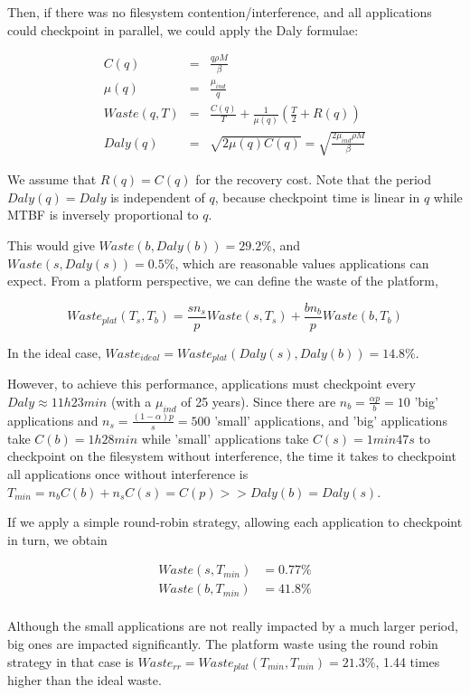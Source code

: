 \documentclass{article}
\begin{document}
Then, if there was no filesystem contention/interference, and all applications could checkpoint in parallel, we could apply the Daly formulae:

\begin{eqnarray}
C(q) &=& \frac{q\rho M}{\beta}\\
\mu(q) &=& \frac{\mu_{ind}}{q}\\
Waste(q, T) &=& \frac{C(q)}{T} + \frac{1}{\mu(q)}\left(\frac{T}{2}+R(q)\right)\\
Daly(q) &=& \sqrt{2\mu(q)C(q)} = \sqrt{\frac{2\mu_{ind}\rho M}{\beta}}
\end{eqnarray}

We assume that $R(q) =C(q)$ for the recovery cost. Note that the period $Daly(q)=Daly$ is independent of
$q$, because checkpoint time is linear in $q$ while MTBF is inversely proportional to $q$.

This would give $Waste(b, Daly(b)) = 29.2\%$, and $Waste(s, Daly(s)) = 0.5\%$, which are reasonable values applications can expect. From a platform perspective, we can define the waste of the platform,

$$Waste_{plat}(T_s, T_b) = \frac{s n_{s}}{p}Waste(s, T_s) + \frac{b n_{b}}{p}Waste(b, T_b)$$

In the ideal case, $Waste_{ideal} = Waste_{plat}(Daly(s), Daly(b)) = 14.8\%$.

However, to achieve this performance, applications must checkpoint every $Daly \approx 11h23min$ (with a $\mu_{ind}$ of 25 years).
Since there are $n_b = \frac{\alpha p}{b} = 10$ 'big' applications and $n_s = \frac{(1-\alpha)p}{s} = 500$ 'small' applications, and 'big' applications take $C(b) = 1h28min$ while 'small' applications take $C(s) = 1min47s$ to checkpoint on the filesystem without interference, the time it takes to checkpoint all applications once without interference is $T_{min} = n_bC(b) + n_sC(s) = C(p) >> Daly(b) = Daly(s)$.

If we apply a simple round-robin strategy, allowing each application to checkpoint in turn, we obtain

$$
\begin{array}{rl}
Waste(s, T_{min}) &= 0.77\%\\
Waste(b, T_{min}) &= 41.8\%\\
\end{array}
$$

Although the small applications are not really impacted by a much larger period, big ones are impacted significantly. The platform waste using the round robin strategy in that case is $Waste_{rr} = Waste_{plat}(T_{min}, T_{min}) = 21.3\%$, 1.44 times higher than the ideal waste.
\end{document}
